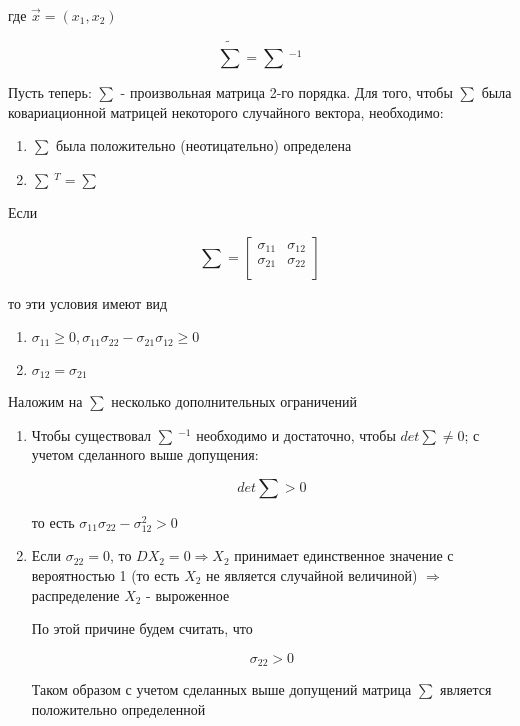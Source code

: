 \documentclass[a4paper, 14pt]{report}
\begin{document}
где $\vec x = (x_1, x_2)$

$$
\tilde \sum = \sum\ ^{-1}
$$

Пусть теперь: $\sum$ - произвольная матрица 2-го порядка. Для того, чтобы $\sum$ была ковариационной матрицей некоторого случайного вектора, необходимо:

\begin{enumerate}
    \item $\sum$ была положительно (неотицательно) определена
    \item $\sum\ ^T = \sum$
\end{enumerate}

Если

$$
\sum =
\left[
    \begin{matrix}
        \sigma_{11} & \sigma_{12} \\
        \sigma_{21} & \sigma_{22} \\
    \end{matrix}
\right]
$$

то эти условия имеют вид

\begin{enumerate}
    \item $\sigma_{11} \geq 0, \sigma_{11} \sigma_{22} - \sigma_{21} \sigma_{12} \geq 0$
    \item $\sigma_{12} = \sigma_{21}$
\end{enumerate}

Наложим на $\sum$ несколько дополнительных ограничений

\begin{enumerate}
    \item Чтобы существовал $\sum\ ^{-1}$ необходимо и достаточно, чтобы $det \sum \ne 0$; с учетом сделанного выше допущения:

        $$
        det \sum > 0
        $$

        то есть $\sigma_{11}\sigma_{22} - \sigma_{12}^2 > 0$

    \item Если $\sigma_{22} = 0$, то $DX_2 = 0 \Rightarrow X_2$ принимает единственное значение с вероятностью 1 (то есть $X_2$ не является случайной величиной) $\Rightarrow$ распределение $X_2$ - выроженное

        По этой причине будем считать, что

        $$
        \sigma_{22} > 0
        $$

        Таком образом с учетом сделанных выше допущений матрица $\sum$ является положительно определенной
\end{enumerate}
\end{document}
